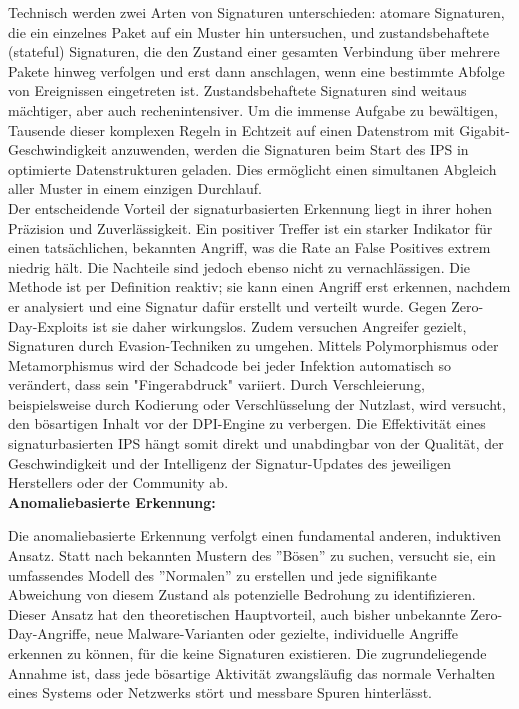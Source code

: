 Technisch werden zwei Arten von Signaturen unterschieden: atomare Signaturen, die ein einzelnes Paket auf ein Muster hin untersuchen, und zustandsbehaftete (stateful) Signaturen, die den Zustand einer gesamten Verbindung über mehrere Pakete hinweg verfolgen und erst dann anschlagen, wenn eine bestimmte Abfolge von Ereignissen eingetreten ist. Zustandsbehaftete Signaturen sind weitaus mächtiger, aber auch rechenintensiver. Um die immense Aufgabe zu bewältigen, Tausende dieser komplexen Regeln in Echtzeit auf einen Datenstrom mit Gigabit-Geschwindigkeit anzuwenden, werden die Signaturen beim Start des IPS in optimierte Datenstrukturen geladen. Dies ermöglicht einen simultanen Abgleich aller Muster in einem einzigen Durchlauf.\\

Der entscheidende Vorteil der signaturbasierten Erkennung liegt in ihrer hohen Präzision und Zuverlässigkeit. Ein positiver Treffer ist ein starker Indikator für einen tatsächlichen, bekannten Angriff, was die Rate an False Positives extrem niedrig hält. Die Nachteile sind jedoch ebenso nicht zu vernachlässigen. Die Methode ist per Definition reaktiv; sie kann einen Angriff erst erkennen, nachdem er analysiert und eine Signatur dafür erstellt und verteilt wurde. Gegen Zero-Day-Exploits ist sie daher wirkungslos. Zudem versuchen Angreifer gezielt, Signaturen durch Evasion-Techniken zu umgehen. Mittels Polymorphismus oder Metamorphismus wird der Schadcode bei jeder Infektion automatisch so verändert, dass sein "Fingerabdruck" variiert. Durch Verschleierung, beispielsweise durch Kodierung oder Verschlüsselung der Nutzlast, wird versucht, den bösartigen Inhalt vor der DPI-Engine zu verbergen. Die Effektivität eines signaturbasierten IPS hängt somit direkt und unabdingbar von der Qualität, der Geschwindigkeit und der Intelligenz der Signatur-Updates des jeweiligen Herstellers oder der Community ab.\\

\textbf{Anomaliebasierte Erkennung:}

Die anomaliebasierte Erkennung verfolgt einen fundamental anderen, induktiven Ansatz. Statt nach bekannten Mustern des ''Bösen'' zu suchen, versucht sie, ein umfassendes Modell des ''Normalen'' zu erstellen und jede signifikante Abweichung von diesem Zustand als potenzielle Bedrohung zu identifizieren. Dieser Ansatz hat den theoretischen Hauptvorteil, auch bisher unbekannte Zero-Day-Angriffe, neue Malware-Varianten oder gezielte, individuelle Angriffe erkennen zu können, für die keine Signaturen existieren. Die zugrundeliegende Annahme ist, dass jede bösartige Aktivität zwangsläufig das normale Verhalten eines Systems oder Netzwerks stört und messbare Spuren hinterlässt.\\

